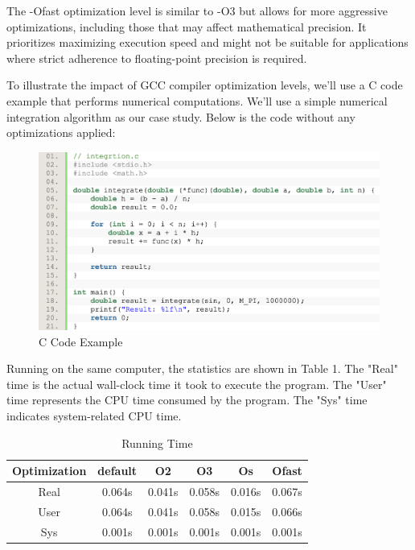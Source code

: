 \documentclass[conference]{IEEEtran}
\begin{document}
The -Ofast optimization level is similar to -O3 but allows for more aggressive optimizations, including those that may affect mathematical precision. It prioritizes maximizing execution speed and might not be suitable for applications where strict adherence to floating-point precision is required.

To illustrate the impact of GCC compiler optimization levels, we'll use a C code example that performs numerical computations. We'll use a simple numerical integration algorithm as our case study. Below is the code without any optimizations applied:

\begin{figure}[htbp]
\centering
\includegraphics [width=0.9\linewidth]{pictures/gcc_sample_code.png}
\caption{C Code Example\cite{b3}}
\label{fig}
\end{figure}

Running on the same computer, the statistics are shown in Table 1. The "Real" time is the actual wall-clock time it took to execute the program. The "User" time represents the CPU time consumed by the program. The "Sys" time indicates system-related CPU time.\cite{b3}


\begin{table}
	\caption{Running Time}
	\begin{center}
		\begin{tabular}{c c c c c c}
			\toprule
			Optimization &default&O2&O3&Os&Ofast\\
			\hline
			Real & 0.064s & 0.041s & 0.058s & 0.016s & 0.067s\\
			User & 0.064s & 0.041s & 0.058s & 0.015s & 0.066s\\
			Sys  & 0.001s & 0.001s & 0.001s & 0.001s & 0.001s\\
			\bottomrule
		\end{tabular}
	\end{center}
\end{table}
\end{document}
